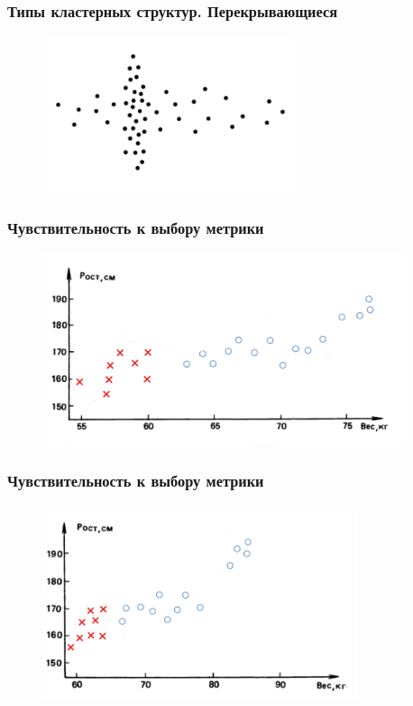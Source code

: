\documentclass[12pt]{beamer}
\begin{document}
\begin{frame}\frametitle{Типы кластерных структур. Перекрывающиеся}
\begin{figure}[htbp]
  \includegraphics[height=130pt, keepaspectratio = true]{images/cluster6}  
\end{figure}
\end{frame}

\begin{frame}\frametitle{Чувствительность к выбору метрики}
\begin{figure}[htbp]
  \includegraphics[height=160pt, keepaspectratio = true]{images/students}  
\end{figure}
\end{frame}

\begin{frame}\frametitle{Чувствительность к выбору метрики}
\begin{figure}[htbp]
  \includegraphics[height=160pt, keepaspectratio = true]{images/students1}  
\end{figure}
\end{frame}
\end{document}
